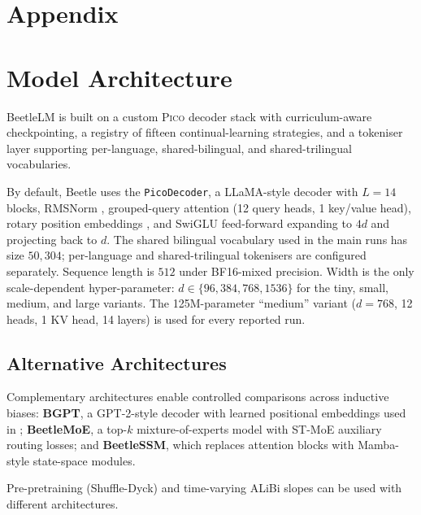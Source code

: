 \documentclass[11pt]{article}
\newcommand{\beetle}{Beetle} %
\begin{document}
\section*{Appendix}


\section{Model Architecture}\label{sec:beetle-architecture-registry}
 
BeetleLM is built on a custom \textsc{Pico} decoder stack \citep{diehl-martinez-etal-2025-pico} with curriculum-aware checkpointing, a registry of fifteen continual-learning strategies, and a tokeniser layer supporting per-language, shared-bilingual, and shared-trilingual vocabularies.

By default, \beetle{} uses  the \texttt{PicoDecoder}, a LLaMA-style \citep{touvron2023llama} decoder with $L=14$ blocks, RMSNorm \citep{zhang2019rms}, grouped-query attention \citep{ainslie2023gqa} (12 query heads, 1 key/value head), rotary position embeddings \citep{su2024rope}, and SwiGLU feed-forward \citep{shazeer2020glu} expanding to $4d$ and projecting back to $d$. The shared bilingual vocabulary used in the main runs has size $50{,}304$; per-language and shared-trilingual tokenisers are configured separately. Sequence length is $512$ under BF16-mixed precision. Width is the only scale-dependent hyper-parameter: $d\in\{96,384,768,1536\}$ for the tiny, small, medium, and large variants. The 125M-parameter ``medium'' variant ($d=768$, 12 heads, 1 KV head, 14 layers) is used for every reported run. 

\subsection{Alternative Architectures}

Complementary architectures enable controlled comparisons across inductive biases: \textbf{BGPT}, a GPT-2-style decoder with learned positional embeddings used in \citet{arnett-etal-2025-acquisition}; \textbf{BeetleMoE}, a top-$k$ mixture-of-experts model with ST-MoE auxiliary routing losses; and \textbf{BeetleSSM}, which replaces attention blocks with Mamba-style state-space modules. 

Pre-pretraining (Shuffle-Dyck) and time-varying ALiBi slopes can be used with different architectures. 

\end{document}
